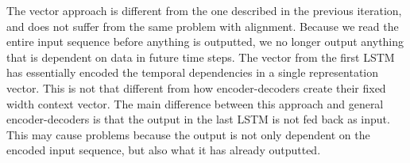 

The vector approach is different from the one described in the previous iteration, and does not suffer from the same problem with alignment. Because we read the entire input sequence before anything is outputted, we no longer output anything that is dependent on data in future time steps. The vector from the first LSTM has essentially encoded the temporal dependencies in a single representation vector. This is not that different from how encoder-decoders create their fixed width context vector. The main difference between this approach and general encoder-decoders is that the output in the last LSTM is not fed back as input. This may cause problems because the output is not only dependent on the encoded input sequence, but also what it has already outputted.